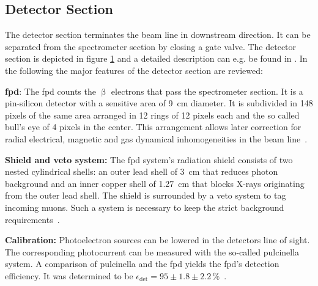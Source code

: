 \subsection{Detector Section}
\label{sec:katrinExpSetupDetector}
\begin{figure}[t]
 \label{fig:katrinExpSetupDetector}
\end{figure}

The detector section terminates the beam line in downstream direction. It can be separated from the spectrometer section by closing a gate valve. The detector section is depicted in figure \ref{fig:katrinExpSetupDetector} and a detailed description can e.g. be found in \cite{Amsbaugh2015}. In the following the major features of the detector section are reviewed:

{\par \textbf{\Gls{fpd}}: The \gls{fpd} counts the $\upbeta$ electrons that pass the spectrometer section. It is a pin-silicon detector with a sensitive area of \SI{9}{cm} diameter. It is subdivided in 148 pixels of the same area arranged in 12 rings of 12 pixels each and the so called bull's eye of 4 pixels in the center. This arrangement allows later correction for radial electrical, magnetic and gas dynamical inhomogeneities in the beam line~\cite{Amsbaugh2015}.}

{\par \textbf{Shield and veto system:} The \gls{fpd} system's radiation shield consists of two nested cylindrical shells: an outer lead shell of \SI{3}{cm} that reduces photon background and an inner copper shell of \SI{1.27}{cm} that blocks X-rays originating from the outer lead shell. The shield is surrounded by a veto system to tag incoming muons. Such a system is necessary to keep the strict background requirements~\cite{Amsbaugh2015}.}

{\par \textbf{Calibration:} Photoelectron sources can be lowered in the detectors line of sight. The corresponding photocurrent can be measured with the so-called \gls{pulcinella} system. A comparison of \gls{pulcinella} and the \gls{fpd} yields the \gls{fpd}'s detection efficiency. It was determined to be $\epsilon_\mathrm{det}=95\pm1.8\pm2.2\,\text{\%}$~\cite{Amsbaugh2015}.}

